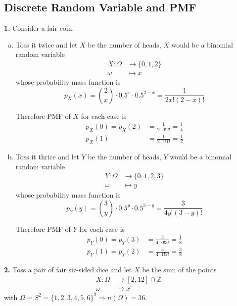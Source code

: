 \documentclass[a4paper,12pt]{article}
\newcommand{\exercise}[1]{\noindent\textbf{#1.}}
\begin{document}
\subsection{Discrete Random Variable and PMF}
\exercise 1  Consider a fair coin.
\begin{enumerate}[(a)]
  \item Toss it twice and let $X$ be the number of heads,
    $X$ would be a binomial random variable
    \begin{align*}
      X\colon \Omega &\to \{0, 1, 2\}\\
      \omega &\mapsto x
    \end{align*}
    whose probability mass function is
    \[p_X(x) = \binom{2}{x}\cdot 0.5^x\cdot 0.5^{2-x}
    = \frac{1}{2x!(2-x)!}\]

    Therefore PMF of $X$ for each case is
    \begin{align*}
      p_X(0) = p_X(2) &= \frac{1}{2\cdot 0!2!} = \frac{1}{4}\\
      p_X(1) &= \frac{1}{2\cdot 1!1!} = \frac{1}{2}
    \end{align*}
  \item Toss it thrice and let $Y$ be the number of heads,
    $Y$ would be a binomial random variable
    \begin{align*}
      Y\colon \Omega &\to \{0, 1, 2, 3\}\\
      \omega &\mapsto y
    \end{align*}
    whose probability mass function is
    \[p_Y(y) = \binom{3}{y}\cdot 0.5^y\cdot 0.5^{3-y}
    = \frac{3}{4y!(3-y)!}\]

    Therefore PMF of $Y$ for each case is
    \begin{align*}
      p_Y(0) = p_Y(3) &= \frac{3}{4\cdot 0!3!} = \frac{1}{8}\\
      p_Y(1) = p_Y(2) &= \frac{3}{4\cdot 1!2!} = \frac{3}{8}
    \end{align*}
\end{enumerate}

\exercise 2  Toss a pair of fair siz-sided dice
and let $X$ be the sum of the points
\begin{align*}
  X\colon \Omega &\to [2, 12]\cap\mathbb Z\\
  \omega &\mapsto x
\end{align*}
with $\Omega = S^2 = \{1, 2, 3, 4, 5, 6\}^2 \Longrightarrow n(\Omega) = 36$.
\end{document}
